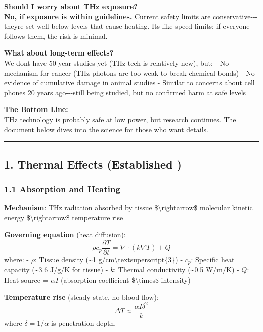 \textbf{Should I worry about THz exposure?}\\
\textbf{No, if exposure is within guidelines.} Current safety limits are
conservative-\/-\/-they\textquotesingle re set well below levels that
cause heating. It\textquotesingle s like speed limits: if everyone
follows them, the risk is minimal.

\textbf{What about long-term effects?}\\
We don\textquotesingle t have 50-year studies yet (THz tech is
relatively new), but: - No mechanism for cancer (THz photons are too
weak to break chemical bonds) - No evidence of cumulative damage in
animal studies - Similar to concerns about cell phones 20 years
ago-\/-\/-still being studied, but no confirmed harm at safe levels

\textbf{The Bottom Line:}\\
THz technology is probably safe at low power, but research continues.
The document below dives into the science for those who want details.

\begin{center}\rule{0.5\linewidth}{0.5pt}\end{center}

\subsection{1. Thermal Effects (Established
)}\label{thermal-effects-established}

\subsubsection{1.1 Absorption and Heating}\label{absorption-and-heating}

\textbf{Mechanism}: THz radiation absorbed by tissue
\$\textbackslash rightarrow\$ molecular kinetic energy
\$\textbackslash rightarrow\$ temperature rise

\textbf{Governing equation} (heat diffusion):
\[\rho c_p \frac{\partial T}{\partial t} = \nabla \cdot (k \nabla T) + Q\]
where: - \(\rho\): Tissue density (\textasciitilde1
g/cm\textbackslash textsuperscript\{3\}) - \(c_p\): Specific heat
capacity (\textasciitilde3.6 J/g/K for tissue) - \(k\): Thermal
conductivity (\textasciitilde0.5 W/m/K) - \(Q\): Heat source =
\(\alpha I\) (absorption coefficient \$\textbackslash times\$ intensity)

\textbf{Temperature rise} (steady-state, no blood flow):
\[\Delta T \approx \frac{\alpha I \delta^2}{k}\] where
\(\delta = 1/\alpha\) is penetration depth.

